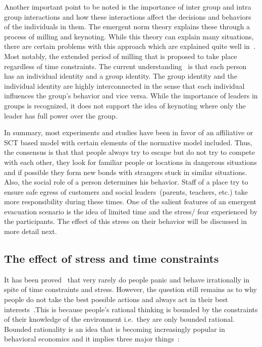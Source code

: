 Another important point to be noted is the importance of inter group and intra group interactions and how these interactions affect the decisions and behaviors of the individuals in them. The emergent norm theory explains these through a process of milling and keynoting. While this theory can explain many situations, there are certain problems with this approach which are explained quite well in~\cite{Reicher:2008ep}. Most notably, the extended period of milling that is proposed to take place regardless of time constraints. The current understanding~\cite{Reicher:2008ep} is that each person has an individual identity and a group identity. The group identity and the individual identity are highly interconnected in the sense that each individual influences the group's behavior and vice versa. While the importance of leaders in groups is recognized, it does not support the idea of keynoting where only the leader has full power over the group.

In summary, most experiments and studies have been in favor of an affiliative or SCT based model with certain elements of the normative model included. Thus, the consensus is that that people always try to escape but do not try to compete with each other, they look for familiar people or locations in dangerous situations and if possible they form new bonds with strangers stuck in similar situations. Also, the social role of a person determines his behavior. Staff of a place try to ensure safe egress of customers and social leaders~(parents, teachers, etc.) take more responsibility during these times. One of the salient features of an emergent evacuation scenario is the idea of limited time and the stress/ fear experienced by the participants. The effect of this stress on their behavior will be discussed in more detail next.

\subsection{The effect of stress and time constraints}
\label{LiteratureReview:RoleOfStress}

 It has been proved~\cite{Kobes:2009jx,Schadschneider:2008cz,Reicher:2008ep,Torres:2010tj,Paulsen:1984ti,Sime:1983uy} that very rarely do people panic and behave irrationally in spite of time constraints and stress. However, the question still remains as to why people do not take the best possible actions and always act in their best interests~\cite{Sandberg:1997tw}.This is because people's rational thinking is bounded by the constraints of their knowledge of the environment i.e.\ they are only bounded rational. Bounded rationality is an idea that is becoming increasingly popular in behavioral economics and it implies three major things~\cite{Jones:1999tn}:

